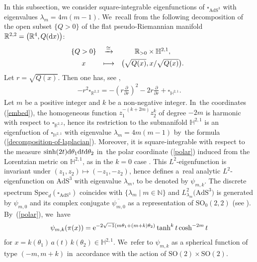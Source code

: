 In this subsection, we consider square-integrable eigenfunctions of
$\square_{\mathrm{AdS}^{3}}$ with eigenvalues $\lambda_{m}=4m(m-1)$. We~recall from \cite[Section~9]{KaKob16} the following decomposition of the open subset $\{Q > 0\}$ of
the flat pseudo-Riemannian manifold $\mathbb{R}^{2,2}=\big(\mathbb{R}^{4},Q({\rm d}x)\big)$:
\begin{align*}
\begin{array}{@{}ccc}
\{Q > 0\} & \xrightarrow{\cong} & \mathbb{R}_{>0} \times \mathbb{H}^{2,1}, \\[1ex]
x & \longmapsto & \big(\sqrt{Q(x)}, x/\sqrt{Q(x)}\big).
\end{array}
\end{align*}
Let $r=\sqrt{Q(x)}$. Then one has, see \cite[p.~215]{KaKob16},
\begin{align}
\label{decomposition-of-laplacian}
-r^2\square_{\mathbb{R}^{2,2}} = -\left(r\frac{\partial}{\partial r}\right)^2 - 2r\frac{\partial}{\partial r} + \square_{\mathbb{H}^{2,1}}.
\end{align}
Let $m$ be a positive integer and $k$ be a non-negative integer. In~the coordinates (\ref{embed}),
the homogeneous function $z_{1}^{-(k+2m)}z_{2}^{k}$ of degree $-2m$
 is harmonic with respect to $\square_{\mathbb{R}^{2,2}}$,
hence its restriction to the submanifold $\mathbb{H}^{2,1}$ is
an eigenfuction of $\square_{\mathbb{H}^{2,1}}$ with eigenvalue $\lambda_{m}=4m(m-1)$
by~the formula (\ref{decomposition-of-laplacian}).
Moreover, it is square-integrable with respect to the measure
$\sinh(2t){\rm d}\theta_{1}{\rm d}t{\rm d}\theta_{2}$ in~the polar coordinate (\ref{polar})
induced from the Lorentzian metric on $\mathbb{H}^{2,1}$,
as in the $k=0$ case \cite[Section~9]{KaKob16}.
This $L^{2}$-eigenfunction is invariant under $(z_{1},z_{2})\mapsto(-z_{1},-z_{2})$,
hence defines a~real analytic $L^{2}$-eigenfunction on $\mathrm{AdS}^{3}$
with eigenvalue $\lambda_{m}$, to be denoted by $\psi_{m,k}$.
The discrete spectrum
$\mathrm{Spec}_{d}(\square_{\mathrm{AdS}^{3}})$ coincides with
$\{\lambda_{m} \mid m \in \mathbb{N}\}$
and $L^{2}_{\lambda_{m}}\big(\mathrm{AdS}^{3}\big)$ is generated by
$\psi_{m,0}$ and its complex conjugate $\overline{\psi_{m,0}}$
as a representation of $\mathrm{SO}_{0}(2,2)$ (see \cite[Claim~9.12]{KaKob16}).
By~(\ref{polar}), we~have
\begin{align}
\label{polarFJ}
\psi_{m,k}(\pi(x))
= {\rm e}^{-2\sqrt{-1}(m\theta_1 + (m+k)\theta_2)}\tanh^{k}t\cosh^{-2m}t
\end{align}
for $x=k(\theta_1)\,a(t)\,k(\theta_2)\in\mathbb{H}^{2,1}$. We~refer to $\psi_{m,k}$ as a spherical function of type $(-m,m+k)$
in~accordance with the action of
$\mathrm{SO}(2)\times\mathrm{SO}(2)$.


